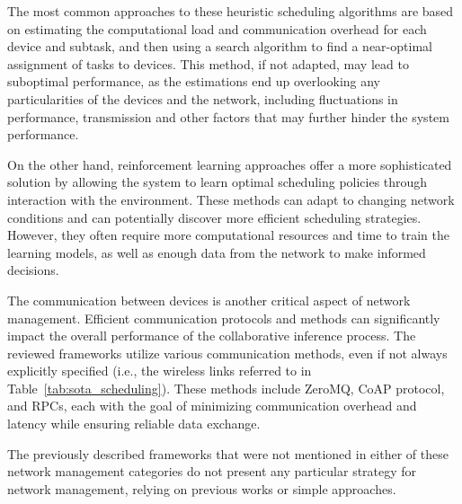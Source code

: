 The most common approaches to these heuristic scheduling algorithms are based on
estimating the computational load and communication overhead for each device and 
subtask, and then using a search algorithm to find a near-optimal assignment of 
tasks to devices. This method, if not adapted, may lead to suboptimal performance,
as the estimations end up overlooking any particularities of the devices and the
network, including fluctuations in performance, transmission and other factors that
may further hinder the system performance. 

On the other hand, reinforcement learning approaches offer a more sophisticated
solution by allowing the system to learn optimal scheduling policies through
interaction with the environment. These methods can adapt to changing network
conditions and can potentially discover more efficient scheduling strategies.
However, they often require more computational resources and time to train the
learning models, as well as enough data from the network to make informed decisions. 

The communication between devices is another critical aspect of network management.
Efficient communication protocols and methods can significantly impact the overall
performance of the collaborative inference process. The reviewed frameworks
utilize various communication methods, even if not always explicitly specified (i.e.,
the wireless links referred to in Table~\ref{tab:sota_scheduling}). 
These methods include ZeroMQ, CoAP protocol, and \ac{RPC}s, each with the goal
of minimizing communication overhead and latency while ensuring reliable data
exchange.

The previously described frameworks that were not mentioned in either of these
network management categories do not present any particular strategy for network 
management, relying on previous works or simple approaches.


